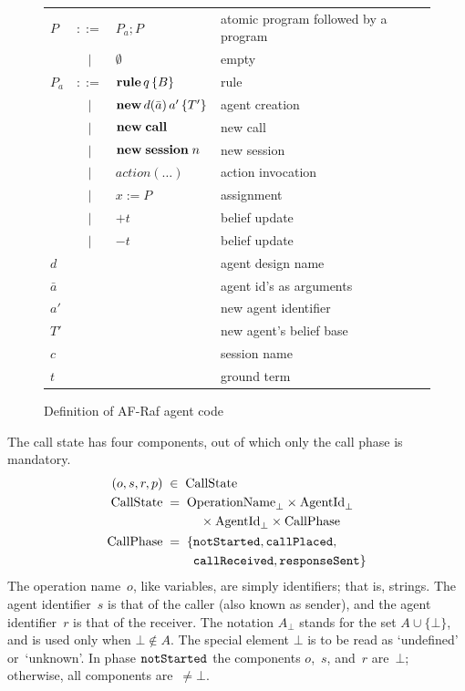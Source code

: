 \documentclass[a4paper,12pt,oneside,fleqn]{book} %
\begin{document}
{\begin{figure} %
\begin{center}
\begin{tabular}{lcll}
  $P$ & $::=$ & $P_a;P$ & atomic program followed by a program 
  \\  & $\mid$ & $\emptyset$  & empty
  \\
  $P_a$ & $::=$ & ${\bf rule}\,q\,\{B\}$ & rule
  \\  & $\mid$ & ${\bf new}\,d(\bar{a})\,a'\,\{T'\}$ & agent creation
  \\  & $\mid$ & ${\bf new }\;{\bf call}$ & new call 
  \\  & $\mid$ & ${\bf new}\;{\bf session}\;n$ & new session
  \\  & $\mid$ & $action(\ldots)$ & action invocation
  \\  & $\mid$ & $x:=P$ & assignment
  \\  & $\mid$ & $+t$ & belief update
  \\  & $\mid$ & $-t$ & belief update
  \\
  $d$ & & & agent design name
  \\
  $\bar{a}$ & & & agent id's as arguments
  \\
  $a'$ & & & new agent identifier
  \\
  $T'$ & & & new agent's belief base
  \\
  $c$ & & & session name
  \\
  $t$ & & & ground term
\end{tabular}
\end{center}
\caption{
Definition of AF-Raf agent code
}
\label{fig:agent-code}
\end{figure} %

The call state has four components, out of which only the call phase is
mandatory.
\begin{align}
(o,s,r,p) &\;\in\; {\rm CallState}
\\
{\rm CallState} &\;=\;
  \begin{aligned}[t]
  &{\rm OperationName}_\bot\times{\rm AgentId}_\bot \\
  &\quad\times{\rm AgentId}_\bot\times{\rm CallPhase}
  \end{aligned}
\\
{\rm CallPhase} &\;=\;
  \begin{aligned}[t]
  \{  &{\tt notStarted}, {\tt callPlaced},\\
      &{\tt callReceived}, {\tt responseSent} \}
  \end{aligned}
\end{align}
The operation name~$o$, like variables, are simply identifiers; that is,
strings. The agent identifier~$s$ is that of the caller (also known as
sender), and the agent identifier~$r$ is that of the receiver. The notation
$A_\bot$ stands for the set $A\cup\{\bot\}$, and is used only when
$\bot\notin A$. The special element $\bot$ is to be read as `undefined'
or~`unknown'. In phase ${\tt notStarted}$ the components $o$,~$s$, and~$r$
are~$\bot$; otherwise, all components are~$\ne\bot$.

}
\end{document}
